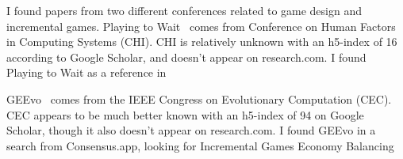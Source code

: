 I found papers from two different conferences related to game design and incremental games.
Playing to Wait~\cite{alharthi_playing_2018} comes from Conference on Human Factors in Computing Systems (CHI).
CHI is relatively unknown with an h5-index of 16 according to Google Scholar, and doesn't appear on research.com.
I found Playing to Wait as a reference in~\cite{rogers_using_2023}

GEEvo~\cite{rupp_geevo_2024} comes from the IEEE Congress on Evolutionary Computation (CEC).
CEC appears to be much better known with an h5-index of 94 on Google Scholar, though it also doesn't appear on research.com.
I found GEEvo in a search from Consensus.app, looking for Incremental Games Economy Balancing
